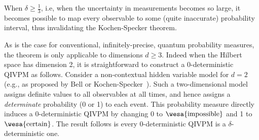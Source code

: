 \documentclass[english,reprint, aps, prl,superscriptaddress, showpacs,
showkeys, longbibliography, amsmath, amssymb, floatfix]{revtex4-1}
\theoremstyle{plain}
\theoremstyle{definition}
\newcommand{\events}{\ensuremath{\mathcal{E}}}
\newcommand{\imposs}{{\text{\wesa{impossible}}}}
\newcommand{\necess}{{\text{\wesa{certain}}}}
\begin{document}
When $\delta \geq \frac{1}{3}$, i.e, when the uncertainty in
measurements becomes so large, it becomes possible to map every
observable to some (quite inaccurate) probability interval, thus
invalidating the Kochen-Specker theorem.

As is the case for conventional, infinitely-precise, quantum
probability measures, the theorem is only applicable to dimensions
$d \geq 3$. Indeed when the Hilbert space has dimension 2, it is
straightforward to construct a 0-deterministic QIVPM as
follows. Consider a non-contextual hidden variable model for $d=2$
(e.g., as proposed by Bell or
Kochen-Specker~\cite{BELL_1966,kochenspecker1967}). Such a
two-dimensional model assigns definite values to all observables at
all times, and hence assigns a \emph{determinate} probability (0 or 1)
to each event. This probability measure directly induces a
0-deterministic QIVPM by changing 0 to $\imposs$ and 1 to
$\necess$. The result follows is every 0-deterministic QIVPM is a
$\delta$-deterministic one. 


\end{document}
